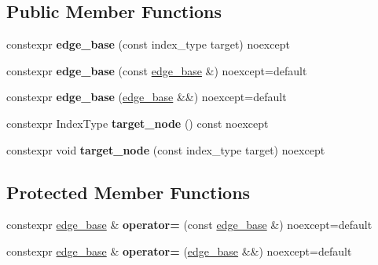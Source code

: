 \subsection*{Public Member Functions}
\begin{DoxyCompactItemize}
\item 
\mbox{\label{classsequoia_1_1maths_1_1edge__base_a514135bfb425bab5ab013929aa429bbe}} 
constexpr {\bfseries edge\+\_\+base} (const index\+\_\+type target) noexcept
\item 
\mbox{\label{classsequoia_1_1maths_1_1edge__base_ab6616f1b265f9cbbdd8e8af67dee3a57}} 
constexpr {\bfseries edge\+\_\+base} (const \mbox{\hyperlink{classsequoia_1_1maths_1_1edge__base}{edge\+\_\+base}} \&) noexcept=default
\item 
\mbox{\label{classsequoia_1_1maths_1_1edge__base_a48fb0e3b775b0919052988edbd85b52e}} 
constexpr {\bfseries edge\+\_\+base} (\mbox{\hyperlink{classsequoia_1_1maths_1_1edge__base}{edge\+\_\+base}} \&\&) noexcept=default
\item 
\mbox{\label{classsequoia_1_1maths_1_1edge__base_ad66daeb0c6e3601563d06f5ee46e3584}} 
constexpr Index\+Type {\bfseries target\+\_\+node} () const noexcept
\item 
\mbox{\label{classsequoia_1_1maths_1_1edge__base_a42f1446b541429acf520cf28bf2e7729}} 
constexpr void {\bfseries target\+\_\+node} (const index\+\_\+type target) noexcept
\end{DoxyCompactItemize}
\subsection*{Protected Member Functions}
\begin{DoxyCompactItemize}
\item 
\mbox{\label{classsequoia_1_1maths_1_1edge__base_a7f8988afd5dcaf3440b226b04f89e61a}} 
constexpr \mbox{\hyperlink{classsequoia_1_1maths_1_1edge__base}{edge\+\_\+base}} \& {\bfseries operator=} (const \mbox{\hyperlink{classsequoia_1_1maths_1_1edge__base}{edge\+\_\+base}} \&) noexcept=default
\item 
\mbox{\label{classsequoia_1_1maths_1_1edge__base_a03854139835f23c804b94bbf5db9ad5f}} 
constexpr \mbox{\hyperlink{classsequoia_1_1maths_1_1edge__base}{edge\+\_\+base}} \& {\bfseries operator=} (\mbox{\hyperlink{classsequoia_1_1maths_1_1edge__base}{edge\+\_\+base}} \&\&) noexcept=default
\end{DoxyCompactItemize}


